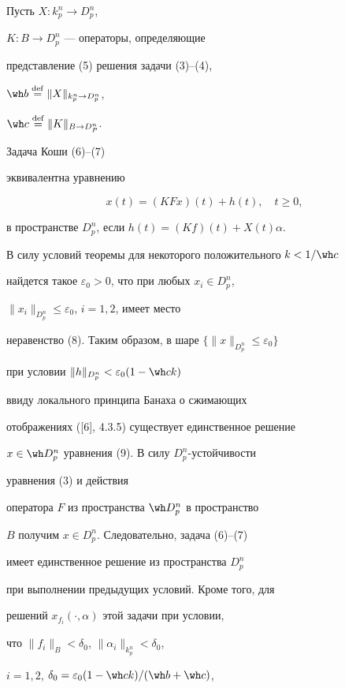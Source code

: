 \begin{pf}


Пусть $X:k_p^n \to D_p^n$,


$K:B \to D_p^n$ --- операторы, определяющие


представление (5) решения задачи (3)--(4),


$\wh b\Def\|X\|_{k_p^n\to D_p^n}$,


$\wh c\Def \|K\|_{B\to D_P^n}$.


Задача Коши (6)--(7)


эквивалентна уравнению


\begin{equation}


x(t) = (KFx)(t) + h(t),\quad t \ge 0,


\end{equation}


в пространстве $D_p^n$, если $h(t) = (Kf)(t) + X(t)\alpha $.





В силу условий теоремы для некоторого положительного $k < 1/\wh c$


найдется такое $\varepsilon _0 > 0$, что при любых $x_i \in D_p^n$,


$\|x_i\|_{D_p^n} \le \varepsilon _0$, $i = 1,2$, имеет место


неравенство (8). Таким образом, в шаре $\{\|x\|_{D_p^n} \le \varepsilon _0\}$


при условии $\|h\|_{D_p^n} < \varepsilon _0(1 - \wh ck)$


ввиду локального принципа Банаха о сжимающих


отображениях ([6], 4.3.5) существует единственное решение


$x \in \wh D_p^n$ уравнения (9). В силу $D_p^n$-устойчивости


уравнения (3) и действия


оператора $F$ из пространства $\wh D_p^n$ в пространство


$B$ получим $x \in D_p^n$. Следовательно, задача (6)--(7)


имеет единственное решение из пространства $D_p^n$


при выполнении предыдущих условий. Кроме того, для


решений $x_{f_i}(\cdot,\alpha )$ этой задачи при условии,


что $\|f_i\|_B < \delta _0$, $\|\alpha _i\|_{k_p^n} < \delta _0$,


$i = 1,2$, $\delta _0 = \varepsilon _0(1 - \wh ck)/(\wh b + \wh c)$,



\end{pf}
